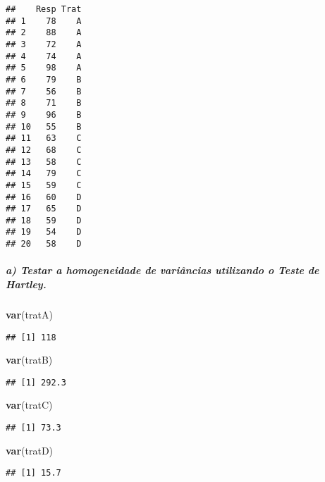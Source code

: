 \documentclass[
]{article}
\newenvironment{Shaded}{\begin{snugshade}}{\end{snugshade}}
\newcommand{\FunctionTok}[1]{\textcolor[rgb]{0.13,0.29,0.53}{\textbf{#1}}}
\newcommand{\NormalTok}[1]{#1}
\begin{document}
\begin{verbatim}
##    Resp Trat
## 1    78    A
## 2    88    A
## 3    72    A
## 4    74    A
## 5    98    A
## 6    79    B
## 7    56    B
## 8    71    B
## 9    96    B
## 10   55    B
## 11   63    C
## 12   68    C
## 13   58    C
## 14   79    C
## 15   59    C
## 16   60    D
## 17   65    D
## 18   59    D
## 19   54    D
## 20   58    D
\end{verbatim}

\hypertarget{a-testar-a-homogeneidade-de-variuxe2ncias-utilizando-o-teste-de-hartley.}{%
\subparagraph{a) Testar a homogeneidade de variâncias utilizando o Teste
de
Hartley.}\label{a-testar-a-homogeneidade-de-variuxe2ncias-utilizando-o-teste-de-hartley.}}

\begin{Shaded}
\begin{Highlighting}[]
\FunctionTok{var}\NormalTok{(tratA) }
\end{Highlighting}
\end{Shaded}

\begin{verbatim}
## [1] 118
\end{verbatim}

\begin{Shaded}
\begin{Highlighting}[]
\FunctionTok{var}\NormalTok{(tratB)}
\end{Highlighting}
\end{Shaded}

\begin{verbatim}
## [1] 292.3
\end{verbatim}

\begin{Shaded}
\begin{Highlighting}[]
\FunctionTok{var}\NormalTok{(tratC) }
\end{Highlighting}
\end{Shaded}

\begin{verbatim}
## [1] 73.3
\end{verbatim}

\begin{Shaded}
\begin{Highlighting}[]
\FunctionTok{var}\NormalTok{(tratD) }
\end{Highlighting}
\end{Shaded}

\begin{verbatim}
## [1] 15.7
\end{verbatim}
\end{document}
